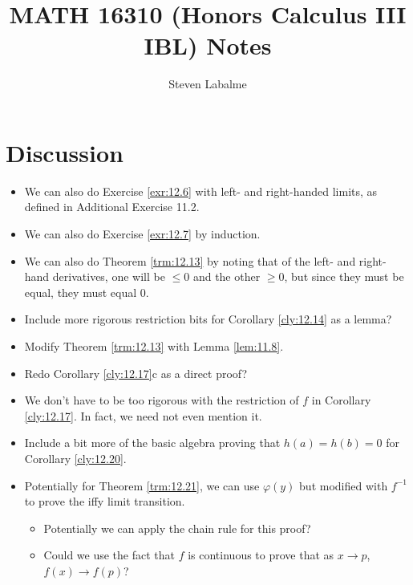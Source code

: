 \documentclass{report}
\title{MATH 16310 (Honors Calculus III IBL) Notes}
\author{Steven Labalme}
\begin{document}
\maketitle



\tableofcontents
\newpage



\pagestyle{main}
\renewcommand{\chaptermark}[1]{\markboth{\chaptername\ \thechapter}{}}
\setcounter{chapter}{11}



\section{Discussion}
\begin{itemize}
    \item {}We can also do Exercise \ref{exr:12.6} with left- and right-handed limits, as defined in Additional Exercise 11.2.
    \item We can also do Exercise \ref{exr:12.7} by induction.
    \item {}We can also do Theorem \ref{trm:12.13} by noting that of the left- and right-hand derivatives, one will be $\leq 0$ and the other $\geq 0$, but since they must be equal, they must equal 0.
    \item Include more rigorous restriction bits for Corollary \ref{cly:12.14} as a lemma?
    \item {}Modify Theorem \ref{trm:12.13} with Lemma \ref{lem:11.8}.
    \item Redo Corollary \ref{cly:12.17}c as a direct proof?
    \item We don't have to be too rigorous with the restriction of $f$ in Corollary \ref{cly:12.17}. In fact, we need not even mention it.
    \item Include a bit more of the basic algebra proving that $h(a)=h(b)=0$ for Corollary \ref{cly:12.20}.
    \item Potentially for Theorem \ref{trm:12.21}, we can use $\varphi(y)$ but modified with $f^{-1}$ to prove the iffy limit transition.
    \begin{itemize}
        \item Potentially we can apply the chain rule for this proof?
        \item Could we use the fact that $f$ is continuous to prove that as $x\to p$, $f(x)\to f(p)$?
    \end{itemize}
\end{itemize}
\end{document}
